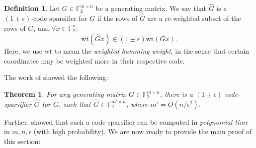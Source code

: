 \documentclass[11pt]{article}
\newtheorem{theorem}{Theorem}[section]
\theoremstyle{definition}
\newtheorem{definition}{Definition}[section]
\newcommand{\F}{\mathbb{F}}
\newcommand{\eps}{\epsilon}
\newcommand{\wt}{\mathrm{wt}}
\begin{document}
\begin{definition}
	Let $G \in \F_2^{m \times n}$ be a generating matrix. We say that $\hat{G}$ is a $(1 \pm \eps)$-code sparsifier for $G$ if the rows of $\hat{G}$ are a re-weighted subset of the rows of $G$, and $\forall x \in \F_2^n$:
	\[
	\wt(\hat{G}x) \in (1 \pm \eps) \wt(Gx).
	\]
	Here, we use $\wt$ to mean the \emph{weighted hamming weight}, in the sense that certain coordinates may be weighted more in their respective code. 
\end{definition}

The work of \cite{KPS24} showed the following:

\begin{theorem}\cite{KPS24}\label{thm:codeSparsification}
	For any generating matrix $G \in \F_2^{m \times n}$, there is a $(1 \pm \eps)$ code-sparsifier $\hat{G}$ for $G$, such that $\hat{G} \in \F_2^{m' \times n}$, where $m' = \widetilde{O}(n / \eps^2)$.
\end{theorem}

Further, \cite{KPS24c} showed that such a code sparsifier can be computed in \emph{polynomial time} in $m, n, \eps$ (with high probability). We are now ready to provide the main proof of this section:
\end{document}
